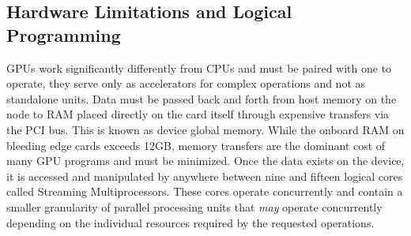 \documentclass[paper=a4, fontsize=11pt]{scrartcl} %
\numberwithin{equation}{section} %
\numberwithin{figure}{section} %
\numberwithin{table}{section} %
\begin{document}
\subsection{Hardware Limitations and Logical Programming}
GPUs work significantly differently from CPUs and must be paired with one to operate, they serve only as accelerators for complex operations and not as standalone units. Data must be passed back and forth from host memory on the node to RAM placed directly on the card itself through expensive transfers via the PCI bus. This is known as device global memory. While the onboard RAM on bleeding edge cards exceeds 12GB, memory transfers are the dominant cost of many GPU programs and must be minimized. Once the data exists on the device, it is accessed and manipulated by anywhere between nine and fifteen logical cores called Streaming Multiprocessors. These cores operate concurrently and contain a smaller granularity of parallel processing units that \textit{may} operate concurrently depending on the individual resources required by the requested operations.
\end{document}
